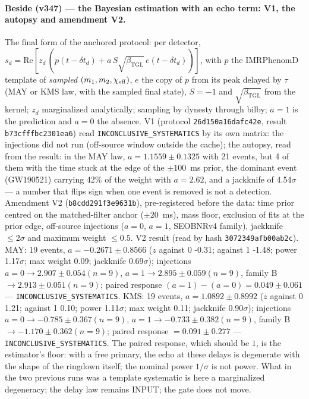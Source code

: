 \documentclass[11pt]{article}
\newcommand{\bTGL}{\beta_{\mathrm{TGL}}}\newcommand{\Msun}{M_{\odot}}\newcommand{\TGL}{\mathrm{TGL}}
\theoremstyle{definition}\newtheorem{deriv}{Derivation}
\begin{document}
\paragraph*{Beside (v347) --- the Bayesian estimation with an echo term: V1, the autopsy and amendment V2.} The final form of the anchored protocol: per detector, $s_d=\mathrm{Re}[z_d\,(p(t-\delta t_d)+a\,S\sqrt{\bTGL}\,e(t-\delta t_d))]$, with $p$ the IMRPhenomD template of \emph{sampled} $(m_1,m_2,\chi_{\rm eff})$, $e$ the copy of $p$ from its peak delayed by $\tau$ (MAY or KMS law, with the sampled final state), $S=-1$ and $\sqrt{\bTGL}$ from the kernel; $z_d$ marginalized analytically; sampling by dynesty through bilby; $a=1$ is the prediction and $a=0$ the absence. V1 (protocol \texttt{26d150a16dafc42e}, result \texttt{b73cfffbc2301ea6}) read \texttt{INCONCLUSIVE\_SYSTEMATICS} by its own matrix: the injections did not run (off-source window outside the cache); the autopsy, read from the result: in the MAY law, $a=1.1559\pm0.1325$ with 21 events, but 4 of them with the time stuck at the edge of the $\pm100$~ms prior, the dominant event (GW190521) carrying 42\% of the weight with $a=2.62$, and a jackknife of 4.54$\sigma$ --- a number that flips sign when one event is removed is not a detection. Amendment V2 (\texttt{b8cdd291f3e9631b}), pre-registered before the data: time prior centred on the matched-filter anchor ($\pm20$~ms), mass floor, exclusion of fits at the prior edge, off-source injections ($a=0$, $a=1$, SEOBNRv4 family), jackknife $\le2\sigma$ and maximum weight $\le0.5$. V2 result (read by hash \texttt{3072349afb00ab2c}). MAY: 19 events, $a=-0.2671\pm0.8566$ ($z$ against 0 -0.31; against 1 -1.48; power 1.17$\sigma$; max weight 0.09; jackknife 0.69$\sigma$); injections $a{=}0\to2.907\pm0.054 (n=9)$, $a{=}1\to2.895\pm0.059 (n=9)$, family B $\to2.913\pm0.051 (n=9)$; paired response $(a{=}1)-(a{=}0)=0.049\pm0.061$ --- \texttt{INCONCLUSIVE\_SYSTEMATICS}. KMS: 19 events, $a=1.0892\pm0.8992$ ($z$ against 0 1.21; against 1 0.10; power 1.11$\sigma$; max weight 0.11; jackknife 0.90$\sigma$); injections $a{=}0\to-0.785\pm0.367 (n=9)$, $a{=}1\to-0.733\pm0.382 (n=9)$, family B $\to-1.170\pm0.362 (n=9)$; paired response $=0.091\pm0.277$ --- \texttt{INCONCLUSIVE\_SYSTEMATICS}. The paired response, which should be $1$, is the estimator's floor: with a free primary, the echo at these delays is degenerate with the shape of the ringdown itself; the nominal power $1/\sigma$ is not power. What in the two previous runs was a template systematic is here a marginalized degeneracy; the delay law remains INPUT; the gate does not move.
\end{document}
